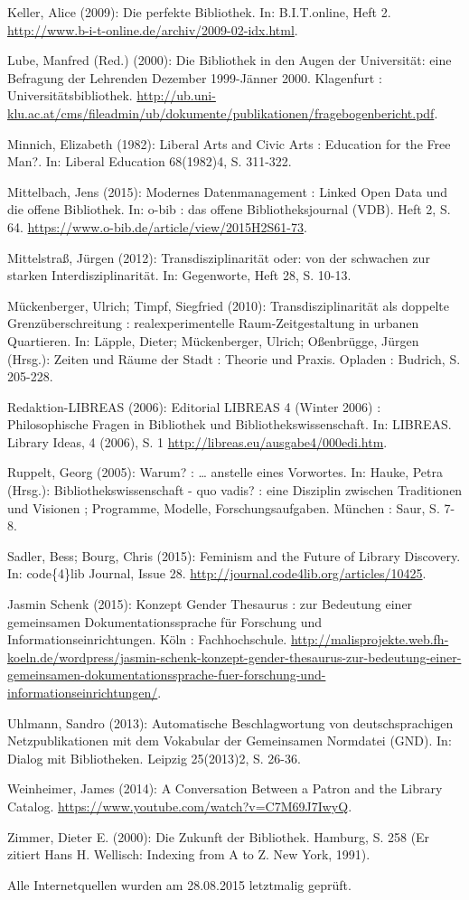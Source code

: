 Keller, Alice (2009): Die perfekte Bibliothek. In: B.I.T.online, Heft 2.
\url{http://www.b-i-t-online.de/archiv/2009-02-idx.html}.

Lube, Manfred (Red.) (2000): Die Bibliothek in den Augen der
Universität: eine Befragung der Lehrenden Dezember 1999-Jänner 2000.
Klagenfurt : Universitätsbibliothek.
\url{http://ub.uni-klu.ac.at/cms/fileadmin/ub/dokumente/publikationen/fragebogenbericht.pdf}.

Minnich, Elizabeth (1982): Liberal Arts and Civic Arts : Education for
the Free Man?. In: Liberal Education 68(1982)4, S. 311-322.

Mittelbach, Jens (2015): Modernes Datenmanagement : Linked Open Data und
die offene Bibliothek. In: o-bib : das offene Bibliotheksjournal (VDB).
Heft 2, S. 64. \url{https://www.o-bib.de/article/view/2015H2S61-73}.

Mittelstraß, Jürgen (2012): Transdisziplinarität oder: von der schwachen
zur starken Interdisziplinarität. In: Gegenworte, Heft 28, S. 10-13.

Mückenberger, Ulrich; Timpf, Siegfried (2010): Transdisziplinarität als
doppelte Grenzüberschreitung : realexperimentelle Raum-Zeitgestaltung in
urbanen Quartieren. In: Läpple, Dieter; Mückenberger, Ulrich;
Oßenbrügge, Jürgen (Hrsg.): Zeiten und Räume der Stadt : Theorie und
Praxis. Opladen : Budrich, S. 205-228.

Redaktion-LIBREAS (2006): Editorial LIBREAS 4 (Winter 2006) :
Philosophische Fragen in Bibliothek und Bibliothekswissenschaft. In:
LIBREAS. Library Ideas, 4 (2006), S. 1
\url{http://libreas.eu/ausgabe4/000edi.htm}.

Ruppelt, Georg (2005): Warum? : \ldots{} anstelle eines Vorwortes. In:
Hauke, Petra (Hrsg.): Bibliothekswissenschaft - quo vadis? : eine
Disziplin zwischen Traditionen und Visionen ; Programme, Modelle,
Forschungsaufgaben. München : Saur, S. 7-8.

Sadler, Bess; Bourg, Chris (2015): Feminism and the Future of Library
Discovery. In: code\{4\}lib Journal, Issue 28.
\url{http://journal.code4lib.org/articles/10425}.

Jasmin Schenk (2015): Konzept Gender Thesaurus : zur Bedeutung einer
gemeinsamen Dokumentationssprache für Forschung und
Informationseinrichtungen. Köln : Fachhochschule.
\url{http://malisprojekte.web.fh-koeln.de/wordpress/jasmin-schenk-konzept-gender-thesaurus-zur-bedeutung-einer-gemeinsamen-dokumentationssprache-fuer-forschung-und-informationseinrichtungen/}.

Uhlmann, Sandro (2013): Automatische Beschlagwortung von
deutschsprachigen Netzpublikationen mit dem Vokabular der Gemeinsamen
Normdatei (GND). In: Dialog mit Bibliotheken. Leipzig 25(2013)2, S.
26-36.

Weinheimer, James (2014): A Conversation Between a Patron and the
Library Catalog. \url{https://www.youtube.com/watch?v=C7M69J7IwyQ}.

Zimmer, Dieter E. (2000): Die Zukunft der Bibliothek. Hamburg, S. 258
(Er zitiert Hans H. Wellisch: Indexing from A to Z. New York, 1991).

Alle Internetquellen wurden am 28.08.2015 letztmalig geprüft.
